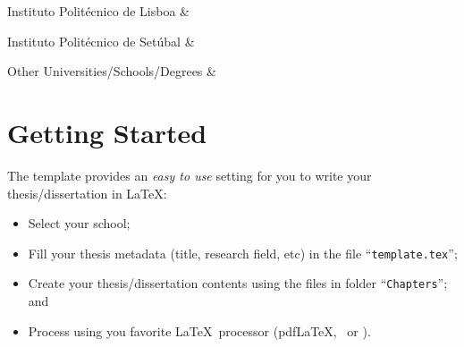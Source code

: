 %
%
\begin{ntUniversity}{Instituto Politécnico de Lisboa}
    {
    } & {
    }\\
\end{ntUniversity}

\begin{ntUniversity}{Instituto Politécnico de Setúbal}
    {
    } & {
    }\\
\end{ntUniversity}

\begin{ntUniversity}{Other Universities/Schools/Degrees}
    {
    } & {
    }\\
\end{ntUniversity}


\section{Getting Started}
\label{sec:getting_started}

The template provides an \emph{easy to use} setting for you to write your thesis/dissertation in \LaTeX:
\begin{itemize}
  \item  Select your school;
  \item Fill your thesis metadata (title, research field, etc) in the file “\texttt{template.tex}”;
  \item Create your thesis/dissertation contents using the files in folder “\texttt{Chapters}”; and
  \item Process using you favorite \LaTeX\ processor (pdf\LaTeX, \XeLaTeX\ or \LuaLaTeX).
\end{itemize}

